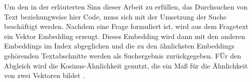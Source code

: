 \documentclass[../main.tex]{subfiles}
\begin{document}
Um den in der  erläuterten Sinn dieser Arbeit zu erfüllen, das Durchsuchen von Text beziehungweise hier Code, muss sich mit der Umsetzung der Suche beschäftigt werden.
Nachdem eine Frage formuliert ist, wird aus dem Fragetext ein Vektor Embedding erzeugt.
Dieses Embedding wird dann mit den anderen Embeddings im Index abgeglichen und die zu den ähnlichsten Embeddings gehörenden Textabschnitte werden als Suchergebnis zurückgegeben. 
FÜr den Abgleich wird die Kosinus-Ähnlichkeit genutzt, die ein Maß für die Ähnlichkeit von zwei Vektoren bildet \cite{rahutomo2012semantic}.
\end{document}

